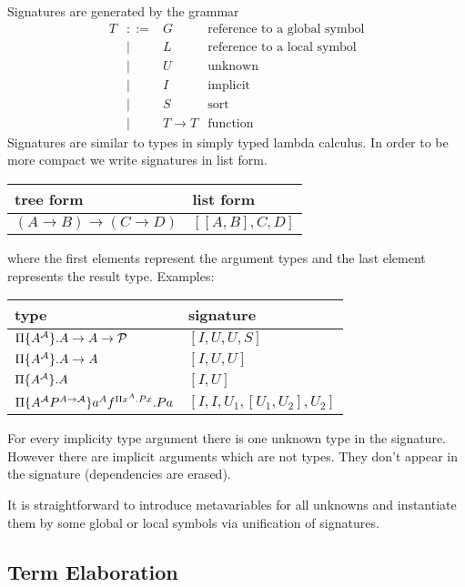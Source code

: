 Signatures are generated by the grammar
$$
\begin{array}{llll}
    T
    &::=&
    G & \text{reference to a global symbol}
    \\
      &\mid&
    L & \text{reference to a local symbol}
    \\
      &\mid&
    U & \text{unknown}
    \\
      &\mid&
    I & \text{implicit}
    \\
      &\mid&
    S & \text{sort}
    \\
      &\mid&
    T \to T & \text{function}
\end{array}
$$
Signatures are similar to types in simply typed lambda calculus. In order to be
more compact we write signatures in list form.

\begin{tabular}{|l|l|}
    \hline
    tree form & list form
    \\ \hline
    $(A \to B) \to (C \to D)$ &
    $[[A,B], C, D]$
    \\
    \hline
\end{tabular}

where the first elements represent the argument types and the last element
represents the result type.
%
Examples:

\begin{tabular}{|l|l|}
    \hline
    type & signature
    \\ \hline
    $\Pi {\{A^{\cal A}\}}. A \to A \to {\cal P}$ &
    $[I, U, U, S]$
    \\
    $\Pi {\{A^{\cal A}\}}. A \to A$ &
    $[I, U, U]$
    \\
    $\Pi {\{A^{\cal A}\}}. A$ &
    $[I, U]$
    \\
    $\Pi {\{A^{\cal A}P^{A \to {\cal A}}\}} a^A f^{\Pi x^A. P x}. P a$ &
    $[I, I, U_1, [U_1, U_2], U_2]$
    \\
    \hline
\end{tabular}

For every implicity type argument there is one unknown type in the signature.
However there are implicit arguments which are not types. They don't appear in
the signature (dependencies are erased).

It is straightforward to introduce metavariables for all unknowns and
instantiate them by some global or local symbols via unification of signatures.







\subsection{Term Elaboration}

